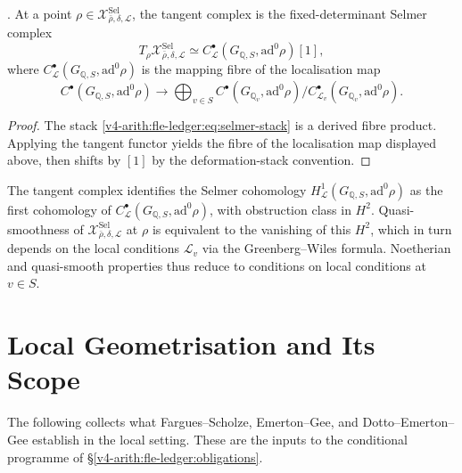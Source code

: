 \begin{proposition}
\label{v4-arith:fle-ledger:prop:selmer-tangent}
\ClaimStatusProvedHere. At a point
\(\rho\in\mathcal{X}^{\mathrm{Sel}}_{\bar\rho,\delta,\mathcal{L}}\),
the tangent complex is the fixed-determinant Selmer complex
\begin{equation}
\label{v4-arith:fle-ledger:eq:selmer-tangent}
T_{\rho}\mathcal{X}^{\mathrm{Sel}}_{\bar\rho,\delta,\mathcal{L}}
\simeq
C^{\bullet}_{\mathcal{L}}(G_{\mathbb{Q},S},\mathrm{ad}^{0}\rho)[1],
\end{equation}
where \(C^{\bullet}_{\mathcal{L}}(G_{\mathbb{Q},S},\mathrm{ad}^{0}\rho)\)
is the mapping fibre of the localisation map
\[
C^{\bullet}(G_{\mathbb{Q},S},\mathrm{ad}^{0}\rho)
\longrightarrow
\bigoplus_{v\in S}
C^{\bullet}(G_{\mathbb{Q}_{v}},\mathrm{ad}^{0}\rho)/
C^{\bullet}_{\mathcal{L}_{v}}(G_{\mathbb{Q}_{v}},\mathrm{ad}^{0}\rho).
\]
\end{proposition}

\begin{proof}
The stack \eqref{v4-arith:fle-ledger:eq:selmer-stack} is a derived fibre
product. Applying the tangent functor yields the fibre of the
localisation map displayed above, then shifts by \([1]\) by the
deformation-stack convention.
\end{proof}

The tangent complex identifies the Selmer cohomology
\(H^{1}_{\mathcal{L}}(G_{\mathbb{Q},S},\mathrm{ad}^{0}\rho)\) as
the first cohomology of
\(C^{\bullet}_{\mathcal{L}}(G_{\mathbb{Q},S},\mathrm{ad}^{0}\rho)\),
with obstruction class in \(H^{2}\). Quasi-smoothness of
\(\mathcal{X}^{\mathrm{Sel}}_{\bar\rho,\delta,\mathcal{L}}\) at
\(\rho\) is equivalent to the vanishing of this \(H^{2}\), which in
turn depends on the local conditions \(\mathcal{L}_{v}\) via the
Greenberg--Wiles formula. Noetherian and quasi-smooth properties thus
reduce to conditions on local conditions at \(v \in S\).

\section{Local Geometrisation and Its Scope}
\label{v4-arith:fle-ledger:local-geometrisation}

The following collects what Fargues--Scholze, Emerton--Gee, and
Dotto--Emerton--Gee establish in the local setting. These are the
inputs to the conditional programme of \S\ref{v4-arith:fle-ledger:obligations}.

